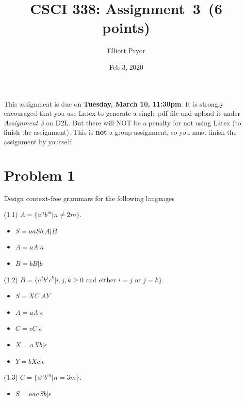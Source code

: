 \documentclass[11pt]{article}
\begin{document}
\date{Feb 3, 2020}
\title{CSCI 338: Assignment~3~(6 points)}

\author{Elliott Pryor}


\maketitle

\noindent
This assignment is due on {\bf Tuesday, March 10, 11:30pm}. It is strongly
encouraged that you use Latex to generate a single pdf file and upload it
under {\em Assignment 3} on D2L. But there will NOT be a penalty for not
using Latex (to finish the assignment). This is {\bf not} a group-assignment,
so you must finish the assignment by yourself.

\section*{Problem 1}

\noindent
Design context-free grammars for the following languages

(1.1) $A=\{a^nb^m|n\neq 2m\}$.

\begin{itemize}
\item $S = aaSb | A | B$
\item $A = aA | a$
\item $B = bB | b$
\end{itemize}


(1.2) $B=\{a^ib^jc^k|i,j,k\geq 0$ and either $i=j$ or $j=k\}$.

\begin{itemize}
\item $S = XC | AY$
\item $A = aA | \epsilon$
\item $C = cC | \epsilon$
\item $X = aXb | \epsilon$
\item $Y = bXc | \epsilon$

\end{itemize}

(1.3) $C=\{a^nb^m|n=3m\}$.

\begin{itemize}
\item $S = aaaSb | \epsilon$

\end{itemize}
\end{document}
